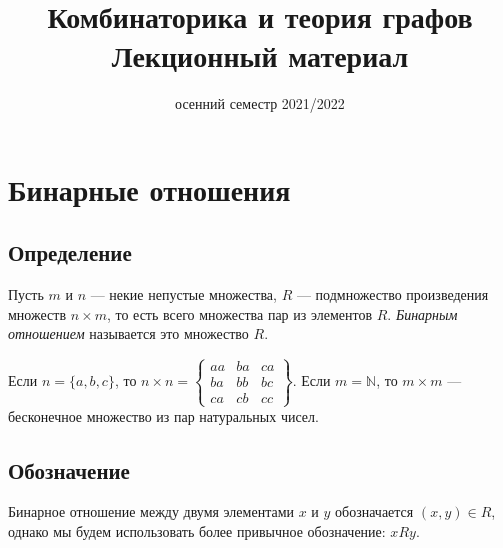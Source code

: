 \documentclass[russian]{lecture-notes}
\title{Комбинаторика и теория графов\\Лекционный материал}
\date{осенний семестр 2021/2022}
\begin{document}
	\maketitle
	\section{Бинарные отношения}
	\subsection{Определение}
	\begin{definition}
		Пусть $m$ и $n$ --- некие непустые множества, $R$ --- подмножество произведения множеств $n \times m$, то есть всего множества пар из элементов $R$. \textit{Бинарным отношением} называется это множество $R$.
		\begin{example}
			Если $n = \{a,b,c\}$, то $n \times n = \begin{Bmatrix}aa & ba & ca\\ba & bb & bc\\ca & cb & cc\end{Bmatrix}$.
			Если $m = \mathbb{N}$, то $m \times m$ --- бесконечное множество из пар натуральных чисел.
		\end{example}
	\end{definition}
	
	\subsection{Обозначение}
	Бинарное отношение между двумя элементами $x$ и $y$ обозначается $(x,y) \in R$, однако мы будем использовать более привычное обозначение: $x R y$.
	
\end{document}
